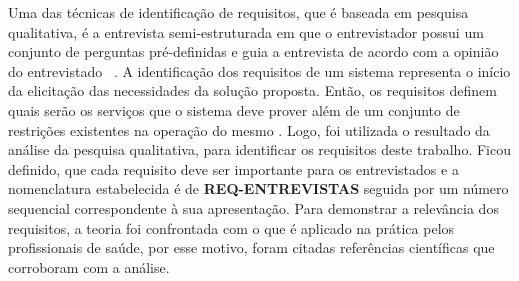 Uma das técnicas de identificação de requisitos, que é baseada em pesquisa qualitativa, é a entrevista semi-estruturada em que o entrevistador possui um conjunto de perguntas pré-definidas e guia a entrevista de acordo com a opinião do entrevistado ~\cite{FLI04}. A identificação dos requisitos de um sistema representa o início da elicitação das necessidades da solução proposta. Então, os requisitos definem quais serão os serviços que o sistema deve prover além de um conjunto de restrições existentes na operação do mesmo \cite{sommerville2011}. Logo, foi utilizada o resultado da análise da pesquisa qualitativa, para identificar os requisitos deste trabalho. Ficou definido, que cada requisito deve ser importante para os entrevistados e a nomenclatura estabelecida é de \textbf{REQ-ENTREVISTAS} seguida por um número sequencial correspondente à sua apresentação. Para demonstrar a relevância dos requisitos, a teoria foi confrontada com o que é aplicado na prática pelos profissionais de saúde, por esse motivo, foram citadas referências científicas que corroboram com a análise. 





